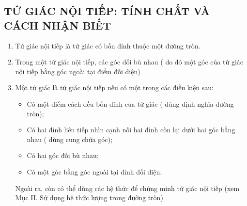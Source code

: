 \subsection{TỨ GIÁC NỘI TIẾP: TÍNH CHẤT VÀ CÁCH NHẬN BIẾT}
\begin{enumerate}[1.]
	\item Tứ giác nội tiếp là tứ giác có bốn đỉnh thuộc một đường tròn.
	\item Trong một tứ giác nội tiếp, các góc đối bù nhau ( do đó một góc của tứ giác nội tiếp bằng góc ngoài tại điểm đối diện)
	\item Một tứ giác là tứ giác nội tiếp nếu có một trong các điều kiện sau:
	\begin{itemize}
		\item Có một điểm cách đều bốn đỉnh của tứ giác ( dùng định nghĩa đường tròn);
		\item Có hai đỉnh liên tiếp nhìn cạnh nối hai đỉnh còn lại dưới hai góc bằng nhau ( dùng cung chứa góc);
		\item Có hai góc đối bù nhau;
		\item Có một góc bằng góc ngoài tại đỉnh đối diện.
	\end{itemize}
	\hspace{1 cm}Ngoài ra, còn có thể dùng các hệ thức để chứng minh tứ giác nội tiếp (xem Mục II. Sử dụng hệ thức lượng trong đường tròn)
\end{enumerate}
\setcounter{vd}{84}
